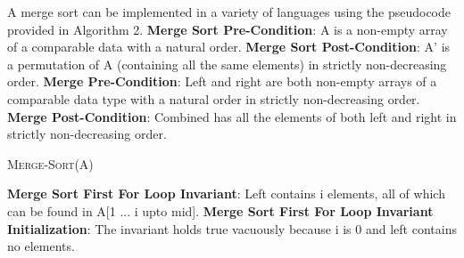 \documentclass[onecolumn, 12pt, article]{IEEEtran}
\numberwithin{case}{problem}
\numberwithin{condition}{problem}
\numberwithin{condition}{subsection}
\numberwithin{definition}{section}
\theoremstyle{remark}
\numberwithin{question}{problem}
\theoremstyle{plain}
\numberwithin{answer}{problem}
\numberwithin{solution}{section}
\numberwithin{equation}{section}%
\begin{document}
A merge sort can be implemented in a variety of languages using the pseudocode provided in Algorithm 2.
\newline
\textbf{Merge Sort Pre-Condition}: A is a non-empty array of a comparable data with a natural order.
\newline
\textbf{Merge Sort Post-Condition}: A' is a permutation of A (containing all the same elements) in strictly non-decreasing order.
\newline
\textbf{Merge Pre-Condition}: Left and right are both non-empty arrays of a comparable data type with a natural order in strictly non-decreasing order.
\newline
\textbf{Merge Post-Condition}: Combined has all the elements of both left and right in strictly non-decreasing order.
\begin{algorithm}
\caption {\textsc{Merge-Sort}(A)}
\label{algo:mergesort}
\begin{algorithmic}[1]
\EndIf
{}
\EndFor
{}
\EndFor
{}
\EndProcedure
\newline
{}
	\EndIf
	\EndIf
\EndWhile
{}
\EndWhile
{}
\EndWhile
{}
\EndProcedure
\end{algorithmic}
\end{algorithm}
\newline
\textbf{Merge Sort First For Loop Invariant}: Left contains i elements, all of which can be found in A[1 ... i upto mid].
\newline
\textbf{Merge Sort First For Loop Invariant Initialization}: The invariant holds true vacuously because i is 0 and left contains no elements.
\newline
\end{document}
